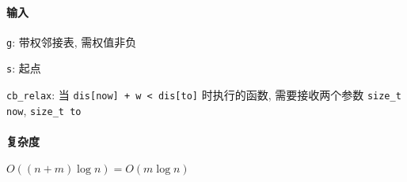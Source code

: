 \paragraph{输入}

\verb|g|: 带权邻接表, 需权值非负

\verb|s|: 起点

\verb|cb_relax|: 当 \verb|dis[now] + w < dis[to]| 时执行的函数, 需要接收两个参数 \verb|size_t now|, \verb|size_t to|

\paragraph{复杂度}

\(O((n+m)\log n)=O(m\log n)\)
